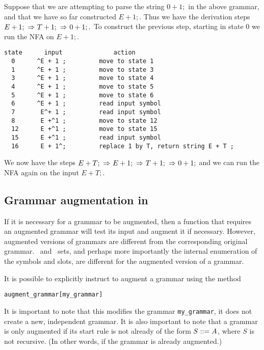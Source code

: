 Suppose that we are attempting to parse the string $0+1;$ in the above grammar,
and that we have so far constructed $E+1;$. Thus we have the
derivation steps\quad
$
E+1;\ \mderive{}\ T+1;\ \mderive{}\ 0+1;.
$
\noindent
To construct the previous step, starting in state 0 we
run the NFA on $E+1;$.
\begin{verbatim}
state      input              action
  0      ^E + 1 ;         move to state 1
  1      ^E + 1 ;         move to state 3
  3      ^E + 1 ;         move to state 4
  4      ^E + 1 ;         move to state 5
  5      ^E + 1 ;         move to state 6
  6      ^E + 1 ;         read input symbol
  7       E^+ 1 ;         read input symbol
  8       E +^1 ;         move to state 12
  12      E +^1 ;         move to state 15
  15      E +^1 ;         read input symbol
  16      E + 1^;         replace 1 by T, return string E + T ;     
\end{verbatim}
We now have the steps\quad
$
E+T;\ \mderive{}\ E+1;\ \mderive{}\ T+1;\ \mderive{}\ 0+1;
$\quad
and we can run the NFA again on the input $E+T;$.

\subsection{Grammar augmentation in \gtb}\label{aug}

If it is necessary for a grammar to be augmented, then a \gtb function
that requires an augmented grammar will test its input and augment it
if necessary. However, augmented versions of grammars are different
from the corresponding original grammar. \first\ and \follow\ sets, and
perhaps more importantly the internal enumeration of the symbols and
slots, are different for the augmented version of a grammar.

It is possible to explicitly instruct \gtb to augment a grammar using
the method
\begin{center}\label{p_aug}
\verb+augment_grammar[my_grammar]+
\end{center}

It is important to note that this modifies the grammar
\verb+my_grammar+,
it does not create a new, independent grammar. It is also important to
note that a grammar is only augmented if its start rule is not
already of the form $S::= A$, where $S$ is not recursive.
(In other words, if the grammar is already augmented.)

